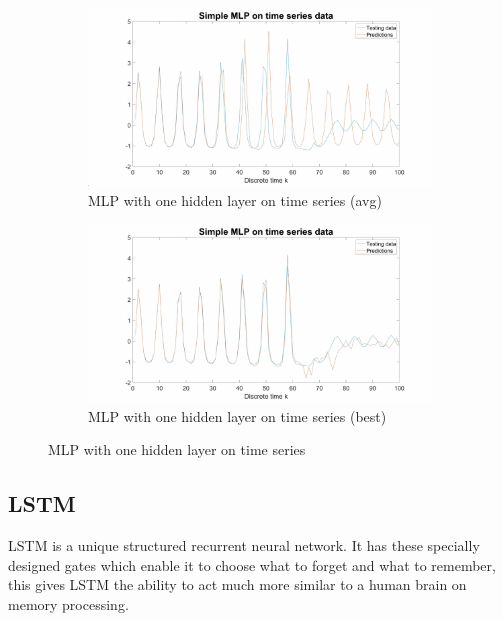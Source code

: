 \documentclass{article}
\begin{document}
\begin{figure}[h!]
\begin{subfigure}[b]{.49\textwidth}
  \centering
  \includegraphics[width=\linewidth]{lab2/mlp_avg.pdf}
  \caption{MLP with one hidden layer on time series (avg)}
  \label{fig:mlpavg}
\end{subfigure}
\hfill
\begin{subfigure}[b]{.49\textwidth}
  \centering
  \includegraphics[width=\linewidth]{lab2/mlp.pdf}
  \caption{MLP with one hidden layer on time series (best)}
  \label{fig:nlpbest}
\end{subfigure}
\caption{MLP with one hidden layer on time series}
\label{fig:mlp}
\end{figure}

\subsection{LSTM}

LSTM is a unique structured recurrent neural network. It has these specially designed gates which enable it to choose what to forget and what to remember, this gives LSTM the ability to act much more similar to a human brain on memory processing.
\end{document}
